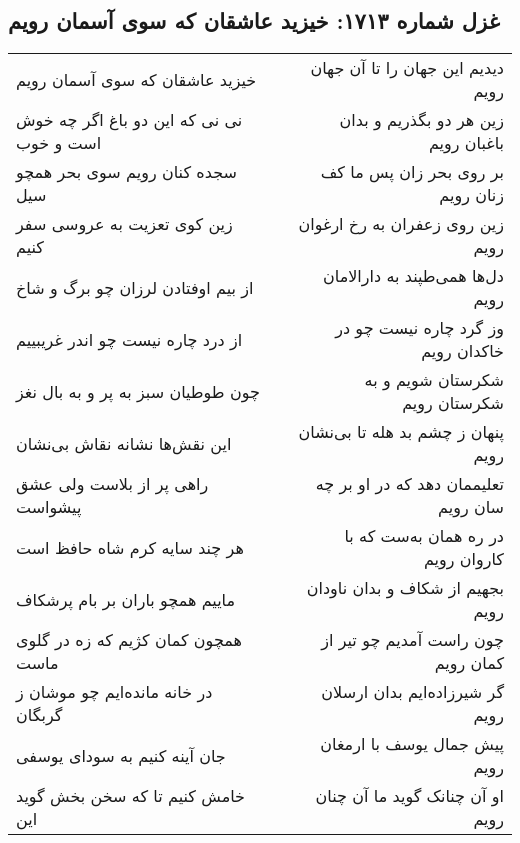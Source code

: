 \begin{center}
\section*{غزل شماره ۱۷۱۳: خیزید عاشقان که سوی آسمان رویم}
\label{sec:1713}
\begin{longtable}{l p{0.5cm} r}
خیزید عاشقان که سوی آسمان رویم
&&
دیدیم این جهان را تا آن جهان رویم
\\
نی نی که این دو باغ اگر چه خوش است و خوب
&&
زین هر دو بگذریم و بدان باغبان رویم
\\
سجده کنان رویم سوی بحر همچو سیل
&&
بر روی بحر زان پس ما کف زنان رویم
\\
زین کوی تعزیت به عروسی سفر کنیم
&&
زین روی زعفران به رخ ارغوان رویم
\\
از بیم اوفتادن لرزان چو برگ و شاخ
&&
دل‌ها همی‌طپند به دارالامان رویم
\\
از درد چاره نیست چو اندر غریبییم
&&
وز گرد چاره نیست چو در خاکدان رویم
\\
چون طوطیان سبز به پر و به بال نغز
&&
شکرستان شویم و به شکرستان رویم
\\
این نقش‌ها نشانه نقاش بی‌نشان
&&
پنهان ز چشم بد هله تا بی‌نشان رویم
\\
راهی پر از بلاست ولی عشق پیشواست
&&
تعلیممان دهد که در او بر چه سان رویم
\\
هر چند سایه کرم شاه حافظ است
&&
در ره همان به‌ست که با کاروان رویم
\\
ماییم همچو باران بر بام پرشکاف
&&
بجهیم از شکاف و بدان ناودان رویم
\\
همچون کمان کژیم که زه در گلوی ماست
&&
چون راست آمدیم چو تیر از کمان رویم
\\
در خانه مانده‌ایم چو موشان ز گربگان
&&
گر شیرزاده‌ایم بدان ارسلان رویم
\\
جان آینه کنیم به سودای یوسفی
&&
پیش جمال یوسف با ارمغان رویم
\\
خامش کنیم تا که سخن بخش گوید این
&&
او آن چنانک گوید ما آن چنان رویم
\\
\end{longtable}
\end{center}
